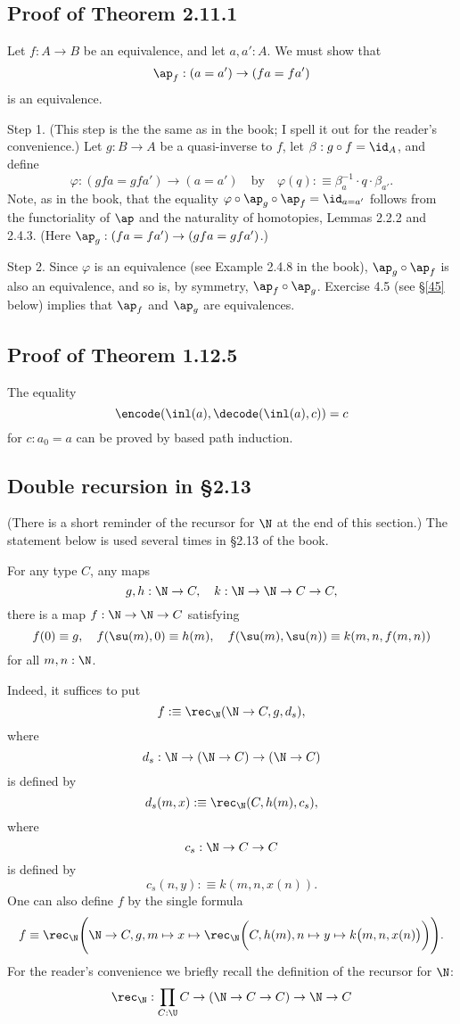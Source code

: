 \documentclass[12pt]{article}
\begin{document}
\subsection{Proof of Theorem 2.11.1}\label{2111}

Let $f:A\to B$ be an equivalence, and let $a,a':A$. We must show that 
$$
\ap_f:(a=a')\to (fa=fa')
$$ 
is an equivalence.

Step 1. (This step is the the same as in the book; I spell it out for the reader's convenience.) Let $g:B\to A$ be a quasi-inverse to $f$, let $\beta:g\circ f=\id_A$, and define 
$$
\varphi:(gfa=gfa')\to(a=a')\quad\text{by}\quad\varphi(q):\equiv\beta_a^{-1}\cdot q\cdot\beta_{a'}.
$$ 
Note, as in the book, that the equality $\varphi\circ\ap_g\circ\ap_f=\id_{a=a'}$ follows from the functoriality of $\ap$ and the naturality of homotopies, Lemmas 2.2.2 and 2.4.3. (Here $\ap_g:(fa=fa')\to (gfa=gfa')$.)

Step 2. Since $\varphi$ is an equivalence (see Example 2.4.8 in the book), $\ap_g\circ\ap_f$ is also an equivalence, and so is, by symmetry, $\ap_f\circ\ap_g$. Exercise 4.5 (see \S\ref{45} below) implies that $\ap_f$ and $\ap_g$ are equivalences.



\subsection{Proof of Theorem 1.12.5}

The equality 
$$
\encode(\inl(a),\decode(\inl(a),c))=c
$$ 
for $c:a_0=a$ can be proved by based path induction.


\subsection{Double recursion in \S2.13}

(There is a short reminder of the recursor for $\N$ at the end of this section.) The statement below is used several times in \S2.13 of the book.

For any type $C$, any maps 
$$
g,h:\N\to C,\quad k:\N\to\N\to C\to C,
$$ 
there is a map $f:\N\to\N\to C$ satisfying 
$$
f(0)\equiv g,\quad f(\su(m),0)\equiv h(m),\quad f(\su(m),\su(n))\equiv k(m,n,f(m,n))
$$ 
for all $m,n:\N$.

Indeed, it suffices to put 
$$
f:\equiv\rec_\N(\N\to C,g,d_s),
$$ 
where 
$$
d_s:\N\to(\N\to C)\to(\N\to C)
$$ 
is defined by 
$$
d_s(m,x):\equiv\rec_\N(C,h(m),c_s),
$$ 
where 
$$
c_s:\N\to C\to C
$$ 
is defined by 
$$
c_s(n,y):\equiv k(m,n,x(n)).
$$ 
One can also define $f$ by the single formula
$$
f\equiv\rec_\N\Bigg(\N\to C,g,m\mapsto x\mapsto\rec_\N\bigg(C,h(m),n\mapsto y\mapsto k\big(m,n,x(n)\big)\bigg)\Bigg).
$$ 
For the reader's convenience we briefly recall the definition of the recursor for $\N$:
$$\rec_\N:\prod_{C:\U}C\to(\N\to C\to C)\to\N\to C$$
\end{document}

